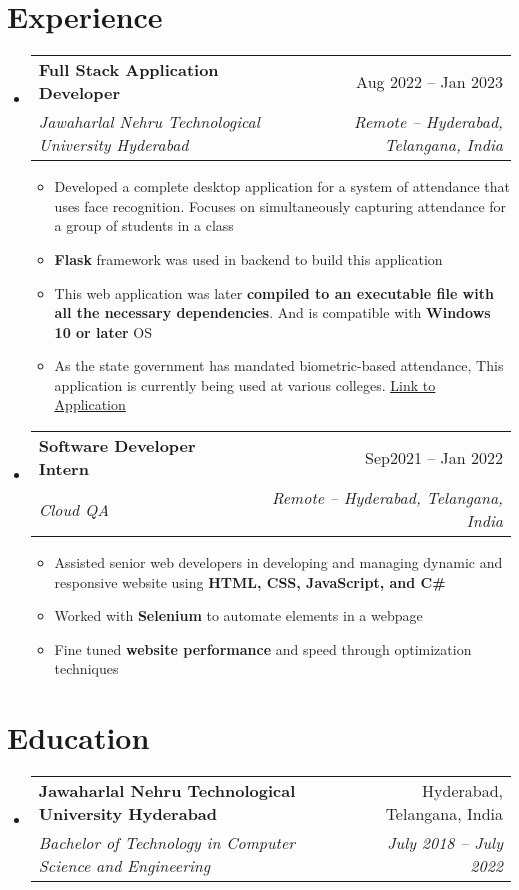 \documentclass[a4paper,11pt]{article}
\makeatletter
\newcommand{\resumeItem}[1]{
  \item\small{#1}
}
\newcommand{\resumeItemListStart}{\begin{itemize}[rightmargin=0.11in]}
\newcommand{\resumeItemListEnd}{\end{itemize}}
\newcommand{\resumeQuadHeading}[4]{
  \item
  \begin{tabular*}{0.96\textwidth}[t]{l@{\extracolsep{\fill}}r}
    \textbf{#1} & #2 \\
    \textit{\small#3} & \textit{\small #4} \\
  \end{tabular*}
}
\newcommand{\resumeHeadingListStart}{
  \begin{itemize}[leftmargin=0.15in, label={}]
}
\newcommand{\resumeHeadingListEnd}{\end{itemize}}
\makeatother
\begin{document}

\section{\color{amaranth} Experience}
\resumeHeadingListStart{}
\resumeQuadHeading{Full Stack Application Developer}{Aug 2022 -- Jan 2023}
  {Jawaharlal Nehru Technological University Hyderabad}{Remote -- Hyderabad, Telangana, India}
    \resumeItemListStart{}
      \resumeItem{Developed a complete desktop application for a system of attendance that uses face recognition. Focuses on simultaneously capturing attendance for a group of students in a class}
      \resumeItem{\textbf{Flask} framework was used in backend to build this application}
      \resumeItem{This web application was later \textbf{compiled to an executable file with all the necessary dependencies}. And is compatible with \textbf{Windows 10 or later} OS}
      \resumeItem{As the state government has mandated biometric-based attendance, This application is currently being used at various colleges. \href{https://github.com/Bhanudeep/Full-Stack-Desktop-Application-for-a-System-Based-on-Face-Recognition-for-Attendance}{\uline{Link to Application}}}
    \resumeItemListEnd{}
  \resumeQuadHeading{Software Developer Intern}{Sep2021 -- Jan 2022}
  {Cloud QA}{Remote -- Hyderabad, Telangana, India}
    \resumeItemListStart{}
      \resumeItem{Assisted senior web developers in developing and managing dynamic and responsive website using \textbf{HTML, CSS, JavaScript, and C\#}}
      \resumeItem{Worked with \textbf{Selenium} to automate elements in a webpage}
      \resumeItem{Fine tuned \textbf{website performance} and speed through optimization techniques}
    \resumeItemListEnd{}

  

\resumeHeadingListEnd{}



\section{\color{amaranth} Education}
  \resumeHeadingListStart{}
    \resumeQuadHeading{Jawaharlal Nehru Technological University Hyderabad}{Hyderabad, Telangana, India}
    {Bachelor of Technology in Computer Science and Engineering}{July 2018 -- July 2022}
  \resumeHeadingListEnd{}
\end{document}
